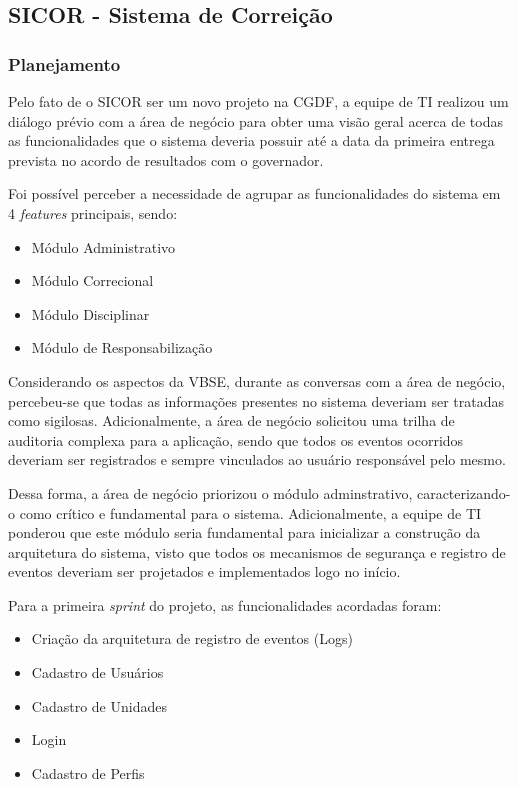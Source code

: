 \clearpage

\subsection{SICOR - Sistema de Correição}

\subsubsection{Planejamento}

Pelo fato de o SICOR ser um novo projeto na CGDF, a equipe de TI realizou um diálogo prévio com a área de negócio para obter uma visão geral acerca de todas as funcionalidades que o sistema deveria possuir até a data da primeira entrega prevista no acordo de resultados com o governador.

Foi possível perceber a necessidade de agrupar as funcionalidades do sistema em 4 \textit{features} principais, sendo:

\begin{itemize}
	\item Módulo Administrativo
	\item Módulo Correcional
	\item Módulo Disciplinar
	\item Módulo de Responsabilização
\end{itemize}

Considerando os aspectos da VBSE, durante as conversas com a área de negócio, percebeu-se que todas as informações presentes no sistema deveriam ser tratadas como sigilosas. Adicionalmente, a área de negócio solicitou uma trilha de auditoria complexa para a aplicação, sendo que todos os eventos ocorridos deveriam ser registrados e sempre vinculados ao usuário responsável pelo mesmo.

Dessa forma, a área de negócio priorizou o módulo adminstrativo, caracterizando-o como crítico e fundamental para o sistema. Adicionalmente, a equipe de TI ponderou que este módulo seria fundamental para inicializar a construção da arquitetura do sistema, visto que todos os mecanismos de segurança e registro de eventos deveriam ser projetados e implementados logo no início.

Para a primeira \textit{sprint} do projeto, as funcionalidades acordadas foram:

\begin{itemize}
	\item Criação da arquitetura de registro de eventos (Logs)
	\item Cadastro de Usuários
	\item Cadastro de Unidades
	\item Login
	\item Cadastro de Perfis
\end{itemize}

